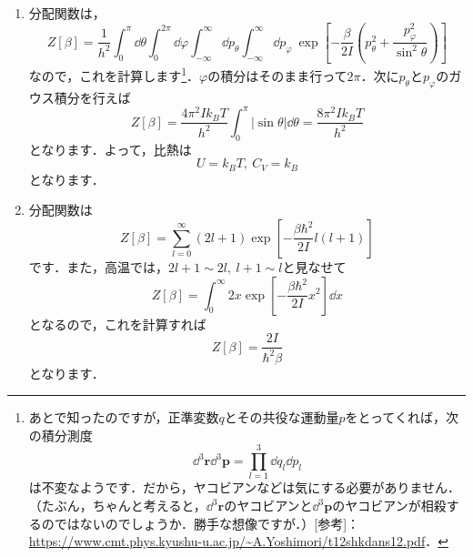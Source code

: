 \documentclass[a4paper,pdflatex,ja=standard]{bxjsarticle}
\begin{document}
\begin{enumerate}

  \item 

  分配関数は，
  \begin{equation}
    Z[\beta]
    =
    \frac{1}{h^2}
    \int_{0}^{\pi}\dd \theta
    \int_{0}^{2\pi}\dd \varphi
    \int_{-\infty}^{\infty}\dd p_{\theta}
    \int_{-\infty}^{\infty}\dd p_{\varphi}\ 
    \exp
    \left[  
      -\frac{\beta}{2I}
      \left(  
        p_{\theta}^2
        +
        \frac{p_{\varphi}^2}{\sin^2\theta}
      \right)
    \right]
  \end{equation}
  なので，これを計算します\footnote{
    あとで知ったのですが，正準変数$q$とその共役な運動量$p$をとってくれば，次の積分測度
    \begin{equation*}
      \dd^3 \bm{r}\dd^3 \bm{p}
      =
      \prod_{l=1}^{3}
      \dd q_l\dd p_l
    \end{equation*}
    は不変なようです．だから，ヤコビアンなどは気にする必要がありません．（たぶん，ちゃんと考えると，$\dd^3\bm{r}$のヤコビアンと$\dd^3\bm{p}$のヤコビアンが相殺するのではないのでしょうか．勝手な想像ですが．）[参考]：\url{https://www.cmt.phys.kyushu-u.ac.jp/~A.Yoshimori/t12shkdans12.pdf}．
  }．$\varphi$の積分はそのまま行って$2\pi$．次に$p_\theta$と$p_{\varphi}$のガウス積分を行えば
  \begin{equation}
    Z[\beta]
    =
    \frac{4\pi^2Ik_BT}{h^2}
    \int_{0}^{\pi}
    |\sin\theta|\dd\theta
    =
    \frac{8\pi^2Ik_BT}{h^2}
  \end{equation}
  となります．よって，比熱は
  \begin{equation}
    U
    =
    k_B T
    ,\ 
    C_V
    =
    k_B
  \end{equation}
  となります．


  \item 

  分配関数は
  \begin{equation}
    Z[\beta]
    =
    \sum_{l=0}^{\infty}
    (2l+1)
    \exp\left[ -\frac{\beta\hbar^2}{2I}l(l+1) \right]
  \end{equation}
  です．また，高温では，$2l+1\sim 2l,\ l+1\sim l$と見なせて
  \begin{equation}
    Z[\beta]
    =
    \int_{0}^{\infty}
    2x\exp\left[ -\frac{\beta\hbar^2}{2I}x^2 \right]
    \dd x
  \end{equation}
  となるので，これを計算すれば
  \begin{equation}
    Z[\beta]
    =
    \frac{2I}{\hbar^2\beta}
  \end{equation}
  となります．


\end{enumerate}
\end{document}

